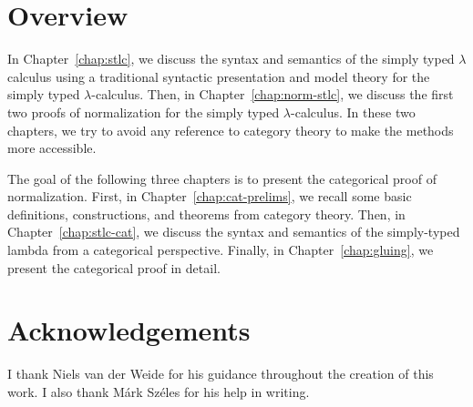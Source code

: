 \section{Overview}

In Chapter~\ref{chap:stlc}, we discuss the syntax and semantics of the simply typed $\lambda$ calculus using a traditional syntactic presentation and model theory for the simply typed $\lambda$-calculus. Then, in Chapter~\ref{chap:norm-stlc}, we discuss the first two proofs of normalization for the simply typed $\lambda$-calculus. In these two chapters, we try to avoid any reference to category theory to make the methods more accessible.

The goal of the following three chapters is to present the categorical proof of normalization. First, in Chapter~\ref{chap:cat-prelims}, we recall some basic definitions, constructions, and theorems from category theory. Then, in Chapter~\ref{chap:stlc-cat}, we discuss the syntax and semantics of the simply-typed lambda from a categorical perspective. Finally, in Chapter~\ref{chap:gluing}, we present the categorical proof in detail.

\section{Acknowledgements}

I thank Niels van der Weide for his guidance throughout the creation of this work. I also thank Márk Széles for his help in writing.

